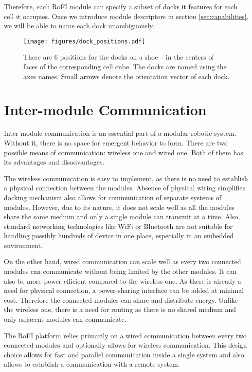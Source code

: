 Therefore, each RoFI module can specify a subset of docks it features for each
cell it occupies. Once we introduce module descriptors in section
\ref{sec:capabilities}, we will be able to name each dock unambiguously.

\begin{figure}[t]
    \centering
    \texttt{[image: figures/dock\_positions.pdf]}
    \caption{There are 6 positions for the docks on a shoe -- in the
    centers of faces of the corresponding cell cube. The docks are named using
    the axes names. Small arrows denote the orientation vector of each dock.}
    \label{fig:dock_positions}
\end{figure}

\section{Inter-module Communication}\label{sec:communication}

Inter-module communication is an essential part of a modular robotic system.
Without it, there is no space for emergent behavior to form. There are two
possible means of communication: wireless one and wired one. Both of them
has its advantages and disadvantages.

The wireless communication is easy to implement, as there is no need to
establish a physical connection between the modules. Absence of physical wiring
simplifies docking mechanism also allows for communication of separate
systems of modules. However, due to its nature, it does not scale well as all
the modules share the same medium and only a single module can transmit at a
time. Also, standard networking technologies like WiFi or Bluetooth are not
suitable for handling possibly hundreds of device in one place, especially in
an embedded environment.

On the other hand, wired communication can scale well as every two connected
modules can communicate without being limited by the other modules. It can also
be more power efficient compared to the wireless one. As there is already a need
for physical connection, a power-sharing interface can be added at minimal cost.
Therefore the connected modules can share and distribute energy. Unlike the
wireless one, there is a need for routing as there is no shared medium and only
adjacent modules can communicate.

The RoFI platform relies primarily on a wired communication between every two
connected modules and optionally allows for wireless communication. This
design choice allows for fast and parallel communication inside a single system
and also allows to establish a communication with a remote system.


